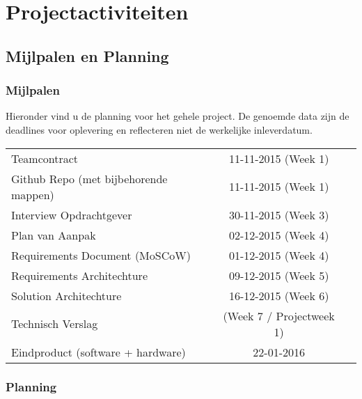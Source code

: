 \chapter{Projectactiviteiten}

\section{Mijlpalen en Planning}
\subsection{Mijlpalen}
Hieronder vind u de planning voor het gehele project. De genoemde data zijn de deadlines voor oplevering en reflecteren niet de werkelijke inleverdatum.
\begin{table}[]
\centering
\begin{tabular}{ l c r }
  Teamcontract & 11-11-2015 (Week 1) \\
  Github Repo (met bijbehorende mappen) & 11-11-2015 (Week 1) \\
  Interview Opdrachtgever & 30-11-2015 (Week 3) \\
  Plan van Aanpak & 02-12-2015 (Week 4) \\
  Requirements Document (MoSCoW) & 01-12-2015 (Week 4) \\
  Requirements Architechture &  09-12-2015 (Week 5) \\
  Solution Architechture & 16-12-2015 (Week 6) \\
  Technisch Verslag	& (Week 7 / Projectweek 1) \\
  Eindproduct (software + hardware)	& 22-01-2016 \\
\end{tabular}
\end{table}

\subsection{Planning}
